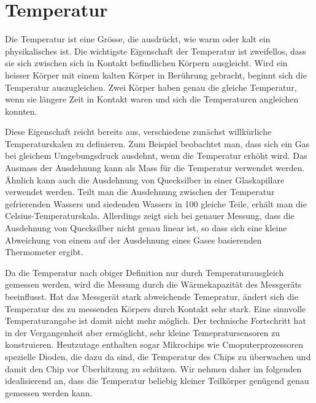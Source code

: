 %
%
%

%
%
\section{Temperatur
\label{buch:fallstudie:temperatur}}
Die Temperatur ist eine Grösse, die ausdrückt, wie warm oder kalt ein
physikalisches ist.
Die wichtigste Eigenschaft der Temperatur ist zweifellos, dass sie
sich zwischen sich in Kontakt befindlichen Körpern ausgleicht.
Wird ein heisser Körper mit einem kalten Körper in Berührung gebracht,
beginnt sich die Temperatur auszugleichen.
Zwei Körper haben genau die gleiche Temperatur, wenn sie längere
Zeit in Kontakt waren und sich die Temperaturen angleichen konnten.

Diese Eigenschaft reicht bereits aus, verschiedene zunächst willkürliche
Temperaturskalen zu definieren.
Zum Beispiel beobachtet man, dass sich ein Gas bei gleichem Umgebungsdruck
ausdehnt, wenn die Temperatur erhöht wird.
Das Ausmass der Ausdehnung kann als Mass für die Temperatur verwendet
werden.
Ähnlich kann auch die Ausdehnung von Quecksilber in einer Glaskapillare
verwendet werden.
Teilt man die Ausdehnung zwischen der Temperatur gefrierenden Wassers und
siedenden Wassers in 100 gleiche Teile, erhält man die Celsius-Temperaturskala.
Allerdings zeigt sich bei genauer Messung, dass die Ausdehnung von
Quecksilber nicht genau linear ist, so dass sich eine kleine Abweichung
von einem auf der Ausdehnung eines Gases basierenden Thermometer
ergibt.

Da die Temperatur nach obiger Definition nur durch Temperaturausgleich
gemessen werden, wird die Messung durch die Wärmekapazität des Messgeräts
beeinflusst.
Hat das Messgerät stark abweichende Temepratur, ändert sich die Temperatur
des zu messenden Körpers durch Kontakt sehr stark.
Eine sinnvolle Temperaturangabe ist damit nicht mehr möglich.
Der technische Fortschritt hat in der Vergangenheit aber ermöglicht, sehr
kleine Temepratursensoren zu konstruieren.
Heutzutage enthalten sogar Mikrochips wie Cmoputerprozessoren spezielle
Dioden, die dazu da sind, die Temperatur des Chips zu überwachen und damit
den Chip vor Überhitzung zu schützen.
Wir nehmen daher im folgenden idealisierend an, dass die Temperatur beliebig
kleiner Teilkörper genügend genau gemessen werden kann.

